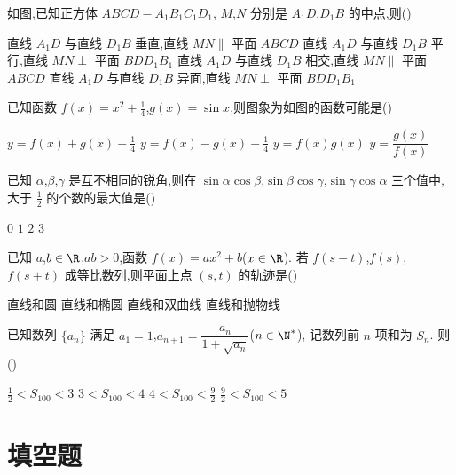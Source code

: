 \begin{problem}
如图,已知正方体
\(ABCD-A_{1}B_{1}C_{1}D_{1}\),
\(M\),\(N\) 分别是 \(A_{1}D\),\(D_{1}B\) 的中点,则(\quad)


\choices
    {直线 \(A_{1}D\) 与直线 \(D_{1}B\) 垂直,直线 \(MN\parallel\) 平面 \(ABCD\)}
    {直线 \(A_{1}D\) 与直线 \(D_{1}B\) 平行,直线 \(MN\perp\) 平面 \(BDD_{1}B_{1}\)}
    {直线 \(A_{1}D\) 与直线 \(D_{1}B\) 相交,直线 \(MN\parallel\) 平面 \(ABCD\)}
    {直线 \(A_{1}D\) 与直线 \(D_{1}B\) 异面,直线 \(MN\perp\) 平面 \(BDD_{1}B_{1}\)}
\end{problem}

\begin{problem}
已知函数
\(f(x)=x^{2}+\frac{1}{4}\),\(g(x)=\sin x\),则图象为如图的函数可能是(\quad)


\choices
    {\(y=f(x)+g(x)-\frac{1}{4}\)}
    {\(y=f(x)-g(x)-\frac{1}{4}\)}
    {\(y=f(x)g(x)\)}
    {\(y=\dfrac{g(x)}{f(x)}\)}
\end{problem}

\begin{problem}
已知 \(\alpha\),\(\beta\),\(\gamma\) 是互不相同的锐角,则在
\(\sin\alpha\cos\beta\),\(\sin\beta\cos\gamma\),\(\sin\gamma\cos\alpha\)
三个值中,大于 \(\frac{1}{2}\) 的个数的最大值是(\quad)

\choices
    {\(0\)}
    {\(1\)}
    {\(2\)}
    {\(3\)}
\end{problem}

\begin{problem}
已知 \(a\),\(b\in\R\),\(ab>0\),函数
\(f(x)=ax^{2}+b\)(\(x\in\R\)). 若
\(f(s-t)\),\(f(s)\),\(f(s+t)\) 成等比数列,则平面上点 \((s,t)\) 的轨迹是(\quad)

\choices
    {直线和圆}
    {直线和椭圆}
    {直线和双曲线}
    {直线和抛物线}
\end{problem}

\begin{problem}
已知数列 \(\{a_n\}\) 满足
\(a_1=1\),\(a_{n+1}=\dfrac{a_n}{1+\sqrt{a_n}}\)(\(n\in\N^*\)),
记数列前 \(n\) 项和为 \(S_n\). 则(\quad)

\choices
    {\(\frac{1}{2}<S_{100}<3\)}
    {\(3<S_{100}<4\)}
    {\(4<S_{100}<\frac{9}{2}\)}
    {\(\frac{9}{2}<S_{100}<5\)}
\end{problem}

\section{填空题}

